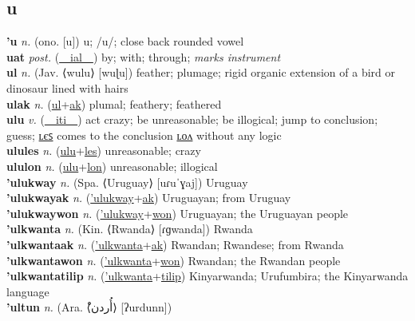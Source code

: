 \subsection{u}

\textbf{'u} \textit{n.} (ono. [u])
u; /u/; close back rounded vowel \label{'u} \\
\textbf{uat} \textit{post.} (\hyperref[ial]{~~ial~~})
by; with; through; \textit{marks instrument} \label{uat} \\
\textbf{ul} \textit{n.} (Jav. ⟨wulu⟩ [wuɭu])
feather; plumage; rigid organic extension of a bird or dinosaur lined with hairs \label{ul} \\
\textbf{ulak} \textit{n.} (\hyperref[ul]{ul}+\hyperref[ak]{ak})
plumal; feathery; feathered \label{ulak} \\
\textbf{ulu} \textit{v.} (\hyperref[iti]{~~iti~~})
act crazy; be unreasonable; be illogical; jump to conclusion; guess; \hyperref[ulules]{ʟєꜱ} comes to the conclusion \hyperref[ululon]{ʟᴏᴧ} without any logic \label{ulu} \\
\textbf{ulules} \textit{n.} (\hyperref[ulu]{ulu}+\hyperref[les]{les})
unreasonable; crazy \label{ulules} \\
\textbf{ululon} \textit{n.} (\hyperref[ulu]{ulu}+\hyperref[lon]{lon})
unreasonable; illogical \label{ululon} \\
\textbf{'ulukway} \textit{n.} (Spa. ⟨Uruguay⟩ [uɾuˈɣaj])
Uruguay \label{'ulukway} \\
\textbf{'ulukwayak} \textit{n.} (\hyperref['ulukway]{'ulukway}+\hyperref[ak]{ak})
Uruguayan; from Uruguay \label{'ulukwayak} \\
\textbf{'ulukwaywon} \textit{n.} (\hyperref['ulukway]{'ulukway}+\hyperref[won]{won})
Uruguayan; the Uruguayan people \label{'ulukwaywon} \\
\textbf{'ulkwanta} \textit{n.} (Kin. ⟨Rwanda⟩ [ɾɡwanda])
Rwanda \label{'ulkwanta} \\
\textbf{'ulkwantaak} \textit{n.} (\hyperref['ulkwanta]{'ulkwanta}+\hyperref[ak]{ak})
Rwandan; Rwandese; from Rwanda \label{'ulkwantaak} \\
\textbf{'ulkwantawon} \textit{n.} (\hyperref['ulkwanta]{'ulkwanta}+\hyperref[won]{won})
Rwandan; the Rwandan people \label{'ulkwantawon} \\
\textbf{'ulkwantatilip} \textit{n.} (\hyperref['ulkwanta]{'ulkwanta}+\hyperref[tilip]{tilip})
Kinyarwanda; Urufumbira; the Kinyarwanda language \label{'ulkwantatilip} \\
\textbf{'ultun} \textit{n.} (Ara. ⟨ْأُردن⟩ [ʔurdunn])

